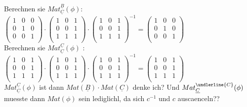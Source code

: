\documentclass{article}
\begin{document}
    \\
    Berechnen sie $Mat^{\underline{B}}_{\underline{C}}(\phi)$: \\
    \begin{math}
    \begin{pmatrix}
      1 & 0 & 0 \\
      0 & 1 & 0 \\
      0 & 0 & 1 \\
    \end{pmatrix}
    \cdot
      \begin{pmatrix}
      1 & 0 & 1 \\
      0 & 0 & 1 \\
      1 & 1 & 1 \\
    \end{pmatrix}
    \cdot
      \begin{pmatrix}
      1 & 0 & 1 \\
      0 & 0 & 1 \\
      1 & 1 & 1 \\
    \end{pmatrix}^{-1}
    =
    \begin{pmatrix}
      1 & 0 & 0 \\
      0 & 1 & 0 \\
      0 & 0 & 1 \\
    \end{pmatrix}
  \end{math}
  \\
  Berechnen sie  $Mat^{\underline{C}}_{\underline{C}}(\phi)$ : \\
  \begin{math}
      \begin{pmatrix}
      1 & 0 & 1 \\
      0 & 0 & 1 \\
      1 & 1 & 1 \\
    \end{pmatrix}
    \cdot
      \begin{pmatrix}
      1 & 0 & 1 \\
      0 & 0 & 1 \\
      1 & 1 & 1 \\
      \end{pmatrix}
      \cdot
      \begin{pmatrix}
      1 & 0 & 1 \\
      0 & 0 & 1 \\
      1 & 1 & 1 \\
    \end{pmatrix}^{-1}
    =
      \begin{pmatrix}
      1 & 0 & 1 \\
      0 & 0 & 1 \\
      1 & 1 & 1 \\
      \end{pmatrix}
    \end{math}
    \\
  $Mat^{\underline{C}}_{\underline{C}}(\phi)$ ist dann $Mat(\underline{B}) \cdot Mat(\underline{C})$ denke ich?
  Und $Mat^{\undlerline{C}}_{\underline{C}}(\phi)$ muesste dann $Mat(\phi)$ sein lediglichl, da sich $c^{-1}$ und $c$ auscaenceln??
\end{document}

